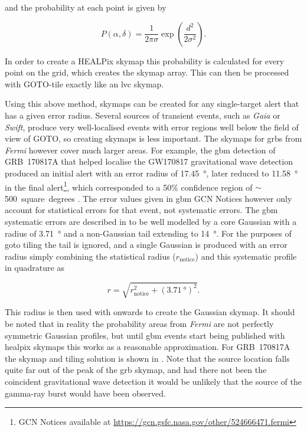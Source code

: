 \begin{colsection}
\begin{colsection}
and the probability at each point is given by

\begin{equation}
    P(\alpha, \delta) = \frac{1}{2\pi\sigma} \exp \left ( \frac{d^2}{2\sigma^2} \right ).
    \label{eq:gaussian_prob}
\end{equation}

In order to create a HEALPix skymap this probability is calculated for every point on the grid, which creates the skymap array. This can then be processed with GOTO-tile exactly like an \gls{lvc} skymap.

Using this above method, skymaps can be created for any single-target alert that has a given error radius. Several sources of transient events, such as \textit{Gaia} or \textit{Swift}, produce very well-localised events with error regions well below the field of view of GOTO, so creating skymaps is less important. The skymaps for \glspl{grb} from \textit{Fermi} however cover much larger areas. For example, the \gls{gbm} detection of GRB~170817A that helped localise the GW170817 gravitational wave detection produced an initial alert with an error radius of \SI{17.45}{\degree}, later reduced to \SI{11.58}{\degree} in the final alert\footnote{GCN Notices available at \url{https://gcn.gsfc.nasa.gov/other/524666471.fermi}}, which corresponded to a 50\% confidence region of $\sim$500~square~degrees \citep{GW170817_Fermi}. The error values given in \gls{gbm} GCN Notices however only account for statistical errors for that event, not systematic errors. The \gls{gbm} systematic errors are described in \citet{Fermi_localisation} to be well modelled by a core Gaussian with a radius of \SI{3.71}{\degree} and a non-Gaussian tail extending to \SI{14}{\degree}. For the purposes of \gls{goto} tiling the tail is ignored, and a single Gaussian is produced with an error radius simply combining the statistical radius ($r_\text{notice}$) and this  systematic profile in quadrature as

\begin{equation}
    r = \sqrt{r_\text{notice}^2 + {(\SI{3.71}{\degree})}^2}.
    \label{eq:fermi_radius}
\end{equation}

This radius is then used with  onwards to create the Gaussian skymap. It should be noted that in reality the probability areas from \textit{Fermi} are not perfectly symmetric Gaussian profiles, but until \gls{gbm} events start being published with \gls{healpix} skymaps this works as a reasonable approximation. For GRB~170817A the skymap and tiling solution is shown in . Note that the source location falls quite far out of the peak of the \gls{grb} skymap, and had there not been the coincident gravitational wave detection it would be unlikely that the source of the gamma-ray burst would have been observed.


\end{colsection}
\end{colsection}
